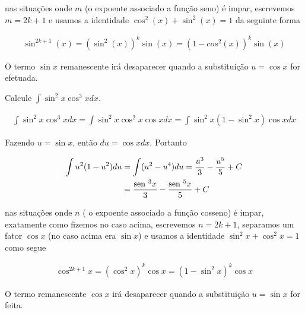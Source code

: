 	\begin{obs}
		nas situações onde $m$ (o expoente associado a função seno) é impar, escrevemos $m = 2k + 1$ e usamos a identidade $\cos^2(x) + \sin^2(x) = 1$ da seguinte forma 
		
		\[\begin{split}
			\sin^{2k+1}(x) = (\sin^{2}(x))^k\sin(x) = (1-cos^2(x))^k\sin(x)
		\end{split}\]
		
		O termo $\sin x$ remanescente irá desaparecer quando a substituição $u = \cos x$ for efetuada.	
	\end{obs} 	
		
		
	\begin{ex}
		Calcule $\int \sin^2x\cos^3xdx$. 
		
		\[\begin{split}
			\int \sin^2x \cos^3xdx = \int \sin^2x \cos^2x \cos x dx = \int \sin^2x (1 - \sin^2x)\cos x dx
		\end{split}\]
	
		Fazendo $ u = \sin x$, então $du = \cos x dx$. Portanto 
		
		\[\begin{split}
			\int u^2(1 - u^2)du & = \int (u^2 - u^4)du = \frac{u^3}{3} - \frac{u^5}{5} + C\\
			& = \frac{\operatorname{sen}\,^3x}{3} - \frac{\operatorname{sen}\,^5x}{5} + C
		\end{split}\]
	\end{ex}
	
	\begin{obs}
		nas situações onde $n$ ( o expoente associado a função cosseno) é ímpar, exatamente como fizemos no caso acima, escrevemos $n = 2k + 1$,  separamos um fator $\cos x$ (no caso acima era $\sin x$) e usamos a identidade $\sin^2x + \cos^2 x = 1$ como segue
		
		\[\begin{split}
			\cos^{2k+1}x = (\cos^2x)^k \cos x = (1 - \sin^2 x)^k \cos x
		\end{split}\]
		
		O termo remanescente $\cos x$ irá desaparecer quando a substituição $ u = \sin x$ for feita.
	\end{obs} 
	
